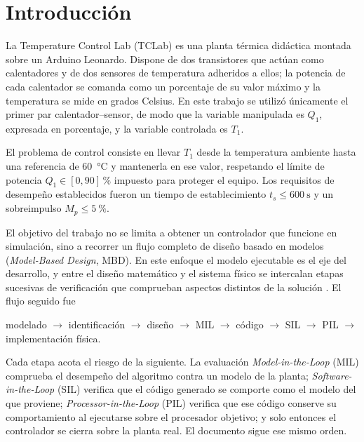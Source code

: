 \documentclass[conference,a4paper,10pt]{IEEEtran}
\begin{document}
\section{Introducción}

La Temperature Control Lab (TCLab) es una planta térmica didáctica montada sobre un Arduino
Leonardo. Dispone de dos transistores que actúan como calentadores y de dos sensores de temperatura
adheridos a ellos; la potencia de cada calentador se comanda como un porcentaje de su valor máximo
y la temperatura se mide en grados Celsius. En este trabajo se utilizó únicamente el primer par
calentador--sensor, de modo que la variable manipulada es $Q_1$, expresada en porcentaje, y la
variable controlada es $T_1$.

El problema de control consiste en llevar $T_1$ desde la temperatura ambiente hasta una referencia
de \SI{60}{\celsius} y mantenerla en ese valor, respetando el límite de potencia
$Q_1 \in [0, 90]\,\si{\percent}$ impuesto para proteger el equipo. Los requisitos de desempeño
establecidos fueron un tiempo de establecimiento $t_s \leq \SI{600}{\second}$ y un sobreimpulso
$M_p \leq \SI{5}{\percent}$.

El objetivo del trabajo no se limita a obtener un controlador que funcione en simulación, sino a
recorrer un flujo completo de diseño basado en modelos (\emph{Model-Based Design}, MBD). En este
enfoque el modelo ejecutable es el eje del desarrollo, y entre el diseño matemático y el sistema
físico se intercalan etapas sucesivas de verificación que comprueban aspectos distintos de la
solución \cite{mw_hil}. El flujo seguido fue

\begin{center}
modelado $\rightarrow$ identificación $\rightarrow$ diseño $\rightarrow$ MIL $\rightarrow$
código $\rightarrow$ SIL $\rightarrow$ PIL $\rightarrow$ implementación física.
\end{center}

Cada etapa acota el riesgo de la siguiente. La evaluación \emph{Model-in-the-Loop} (MIL) comprueba
el desempeño del algoritmo contra un modelo de la planta; \emph{Software-in-the-Loop} (SIL)
verifica que el código generado se comporte como el modelo del que proviene;
\emph{Processor-in-the-Loop} (PIL) verifica que ese código conserve su comportamiento al ejecutarse
sobre el procesador objetivo; y solo entonces el controlador se cierra sobre la planta real. El
documento sigue ese mismo orden.
\end{document}
